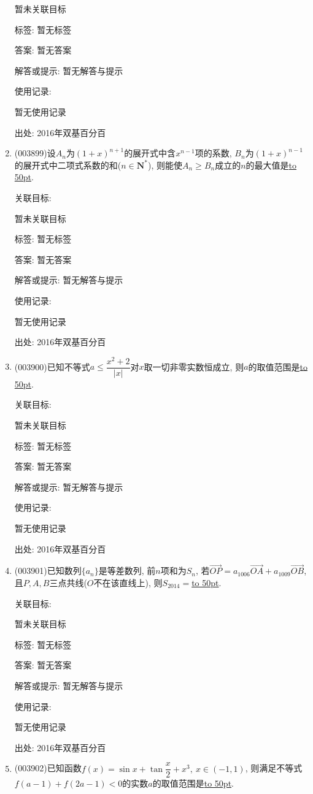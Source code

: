 \documentclass[10pt,a4paper]{article}
\newcommand{\blank}[1]{\underline{\hbox to #1pt{}}}
\begin{document}
\begin{enumerate}[1.]
暂未关联目标



标签: 暂无标签

答案: 暂无答案

解答或提示: 暂无解答与提示

使用记录:

暂无使用记录


出处: 2016年双基百分百
\item { (003899)}设$A_n$为$(1+x)^{n+1}$的展开式中含$x^{n-1}$项的系数, $B_n$为$(1+x)^{n-1}$的展开式中二项式系数的和($n\in \mathbf{N}^*$), 则能使$A_n\ge B_n$成立的$n$的最大值是\blank{50}.


关联目标:

暂未关联目标



标签: 暂无标签

答案: 暂无答案

解答或提示: 暂无解答与提示

使用记录:

暂无使用记录


出处: 2016年双基百分百
\item { (003900)}已知不等式$a\le \dfrac{x^2+2}{|x|}$对$x$取一切非零实数恒成立, 则$a$的取值范围是\blank{50}.


关联目标:

暂未关联目标



标签: 暂无标签

答案: 暂无答案

解答或提示: 暂无解答与提示

使用记录:

暂无使用记录


出处: 2016年双基百分百
\item { (003901)}已知数列$\{a_n\}$是等差数列, 前$n$项和为$S_n$, 若$\overrightarrow{OP}=a_{1006}\overrightarrow{OA}+a_{1009}\overrightarrow{OB}$, 且$P,A,B$三点共线($O$不在该直线上), 则$S_{2014}=$\blank{50}.


关联目标:

暂未关联目标



标签: 暂无标签

答案: 暂无答案

解答或提示: 暂无解答与提示

使用记录:

暂无使用记录


出处: 2016年双基百分百
\item { (003902)}已知函数$f(x)=\sin x+\tan \dfrac x2+x^3, \ x\in (-1,1)$, 则满足不等式$f(a-1)+f(2a-1)<0$的实数$a$的取值范围是\blank{50}.



\end{enumerate}
\end{document}
